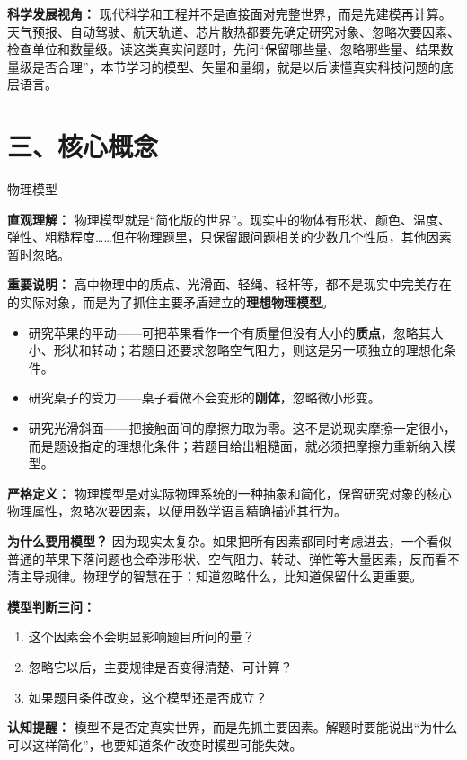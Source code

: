 \textbf{科学发展视角：} 现代科学和工程并不是直接面对完整世界，而是先建模再计算。天气预报、自动驾驶、航天轨道、芯片散热都要先确定研究对象、忽略次要因素、检查单位和数量级。读这类真实问题时，先问“保留哪些量、忽略哪些量、结果数量级是否合理”，本节学习的模型、矢量和量纲，就是以后读懂真实科技问题的底层语言。

\section*{三、核心概念}

\begin{conceptbox}{物理模型}

\textbf{直观理解：} 物理模型就是“简化版的世界”。现实中的物体有形状、颜色、温度、弹性、粗糙程度……但在物理题里，只保留跟问题相关的少数几个性质，其他因素暂时忽略。

\textbf{重要说明：} 高中物理中的质点、光滑面、轻绳、轻杆等，都不是现实中完美存在的实际对象，而是为了抓住主要矛盾建立的\textbf{理想物理模型}。

\begin{itemize}
  \item 研究苹果的平动——可把苹果看作一个有质量但没有大小的\textbf{质点}，忽略其大小、形状和转动；若题目还要求忽略空气阻力，则这是另一项独立的理想化条件。
  \item 研究桌子的受力——桌子看做不会变形的\textbf{刚体}，忽略微小形变。
  \item 研究光滑斜面——把接触面间的摩擦力取为零。这不是说现实摩擦一定很小，而是题设指定的理想化条件；若题目给出粗糙面，就必须把摩擦力重新纳入模型。
\end{itemize}

\textbf{严格定义：} 物理模型是对实际物理系统的一种抽象和简化，保留研究对象的核心物理属性，忽略次要因素，以便用数学语言精确描述其行为。

\textbf{为什么要用模型？} 因为现实太复杂。如果把所有因素都同时考虑进去，一个看似普通的苹果下落问题也会牵涉形状、空气阻力、转动、弹性等大量因素，反而看不清主导规律。物理学的智慧在于：知道忽略什么，比知道保留什么更重要。

\textbf{模型判断三问：}
\begin{enumerate}
  \item 这个因素会不会明显影响题目所问的量？
  \item 忽略它以后，主要规律是否变得清楚、可计算？
  \item 如果题目条件改变，这个模型还是否成立？
\end{enumerate}

\textbf{认知提醒：} 模型不是否定真实世界，而是先抓主要因素。解题时要能说出“为什么可以这样简化”，也要知道条件改变时模型可能失效。

\end{conceptbox}


